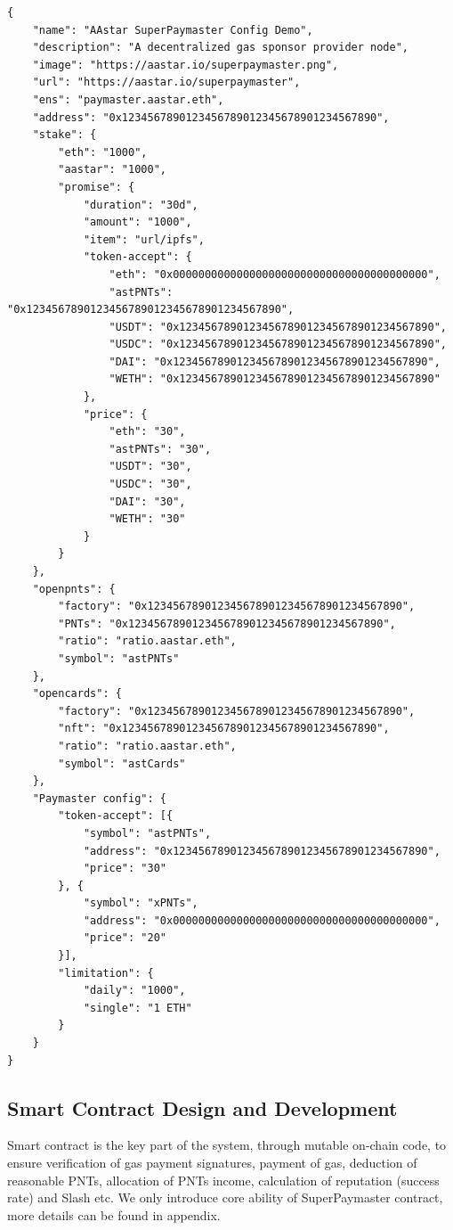 \documentclass[preprint,12pt]{elsarticle}
\begin{document}
\begin{verbatim}
{
    "name": "AAstar SuperPaymaster Config Demo",
    "description": "A decentralized gas sponsor provider node",
    "image": "https://aastar.io/superpaymaster.png",
    "url": "https://aastar.io/superpaymaster",
    "ens": "paymaster.aastar.eth",
    "address": "0x1234567890123456789012345678901234567890",
    "stake": {
        "eth": "1000",
        "aastar": "1000",
        "promise": {
            "duration": "30d",
            "amount": "1000",
            "item": "url/ipfs",
            "token-accept": {
                "eth": "0x0000000000000000000000000000000000000000",
                "astPNTs": "0x1234567890123456789012345678901234567890",
                "USDT": "0x1234567890123456789012345678901234567890",
                "USDC": "0x1234567890123456789012345678901234567890",
                "DAI": "0x1234567890123456789012345678901234567890",
                "WETH": "0x1234567890123456789012345678901234567890"
            },
            "price": {
                "eth": "30",
                "astPNTs": "30",
                "USDT": "30",
                "USDC": "30",
                "DAI": "30",
                "WETH": "30"
            }
        }
    },
    "openpnts": {
        "factory": "0x1234567890123456789012345678901234567890",
        "PNTs": "0x1234567890123456789012345678901234567890",
        "ratio": "ratio.aastar.eth",
        "symbol": "astPNTs"
    },
    "opencards": {
        "factory": "0x1234567890123456789012345678901234567890",
        "nft": "0x1234567890123456789012345678901234567890",
        "ratio": "ratio.aastar.eth",
        "symbol": "astCards"
    },
    "Paymaster config": {
        "token-accept": [{
            "symbol": "astPNTs",
            "address": "0x1234567890123456789012345678901234567890",
            "price": "30"
        }, {
            "symbol": "xPNTs",
            "address": "0x0000000000000000000000000000000000000000",
            "price": "20"
        }],
        "limitation": {
            "daily": "1000",
            "single": "1 ETH"
        }
    }
}
\end{verbatim}

\subsection{Smart Contract Design and Development}
\label{subsec:smart-contract-design}

Smart contract is the key part of the system, through mutable on-chain code, to ensure verification of gas payment signatures, payment of gas, deduction of reasonable PNTs, allocation of PNTs income, calculation of reputation (success rate) and Slash etc. We only introduce core ability of SuperPaymaster contract, more details can be found in appendix.
\end{document}
